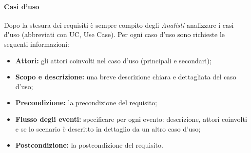 \paragraph{Casi d'uso}
Dopo la stesura dei requisiti è sempre compito degli \textit{Analisti} analizzare i \gls{casi d'uso} (abbreviati con UC, Use Case).
Per ogni caso d'uso sono richieste le seguenti informazioni:
\begin{itemize}
	\item \textbf{Attori:} gli attori coinvolti nel caso d'uso (principali e secondari);
	\item \textbf{Scopo e descrizione:} una breve descrizione chiara e dettagliata del caso d'uso;
	\item \textbf{Precondizione:} la precondizione del requisito;
	\item \textbf{Flusso degli eventi:} specificare per ogni evento: descrizione, attori coinvolti e se lo scenario è descritto in dettaglio da un altro caso d'uso;
	\item \textbf{Postcondizione:} la postcondizione del requisito.
\end{itemize}

\newpage
